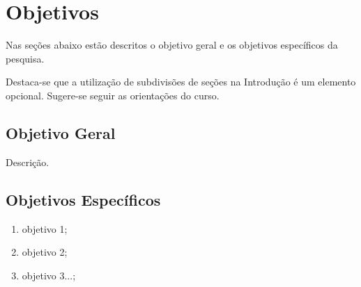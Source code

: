 \section{Objetivos}
Nas seções abaixo estão descritos o objetivo geral e os objetivos específicos da pesquisa.

Destaca-se que a utilização de subdivisões de seções na Introdução é um elemento opcional. Sugere-se seguir as orientações do curso. 
\subsection{Objetivo Geral}
Descrição.


\subsection{Objetivos Específicos}

\begin{enumerate}[label=\alph*)]
    \item objetivo 1;
    \item objetivo 2;
    \item objetivo 3...;
\end{enumerate}